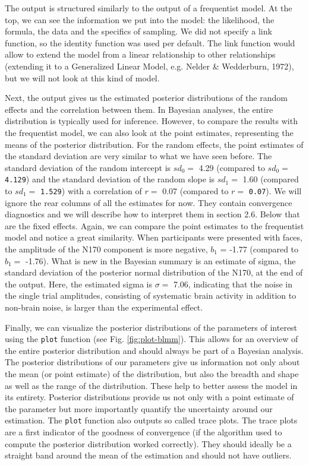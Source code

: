 \documentclass[
  doc,12pt,floatsintext]{apa7}
\begin{document}
\normalsize

The output is structured similarly to the output of a frequentist model. At the top, we can see the information we put into the model: the likelihood, the formula, the data and the specifics of sampling. We did not specify a link function, so the identity function was used per default. The link function would allow to extend the model from a linear relationship to other relationships (extending it to a Generalized Linear Model, e.g. Nelder \& Wedderburn, 1972), but we will not look at this kind of model.

Next, the output gives us the estimated posterior distributions of the random effects and the correlation between them. In Bayesian analyses, the entire distribution is typically used for inference. However, to compare the results with the frequentist model, we can also look at the point estimates, representing the means of the posterior distribution. For the random effects, the point estimates of the standard deviation are very similar to what we have seen before. The standard deviation of the random intercept is \(sd_0 =\) 4.29 (compared to \(sd_0 =\) \texttt{4.129}) and the standard deviation of the random slope is \(sd_1 =\) 1.60 (compared to \(sd_1 =\) \texttt{1.529}) with a correlation of \(r =\) 0.07 (compared to \(r =\) \texttt{0.07}). We will ignore the rear columns of all the estimates for now. They contain convergence diagnostics and we will describe how to interpret them in section 2.6. Below that are the fixed effects. Again, we can compare the point estimates to the frequentist model and notice a great similarity. When participants were presented with faces, the amplitude of the N170 component is more negative, \(b_1\) = -1.77 (compared to \(b_1 =\) -1.76). What is new in the Bayesian summary is an estimate of sigma, the standard deviation of the posterior normal distribution of the N170, at the end of the output. Here, the estimated sigma is \(\sigma =\) 7.06, indicating that the noise in the single trial amplitudes, consisting of systematic brain activity in addition to non-brain noise, is larger than the experimental effect.

Finally, we can visualize the posterior distributions of the parameters of interest using the \texttt{plot} function (see Fig. \ref{fig:plot-blmm}). This allows for an overview of the entire posterior distribution and should always be part of a Bayesian analysis. The posterior distributions of our parameters give us information not only about the mean (or point estimate) of the distribution, but also the breadth and shape as well as the range of the distribution. These help to better assess the model in its entirety. Posterior distributions provide us not only with a point estimate of the parameter but more importantly quantify the uncertainty around our estimation. The \texttt{plot} function also outputs so called trace plots. The trace plots are a first indicator of the goodness of convergence (if the algorithm used to compute the posterior distribution worked correctly). They should ideally be a straight band around the mean of the estimation and should not have outliers.
\end{document}

